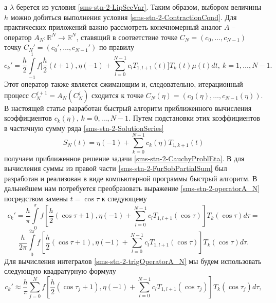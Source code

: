 а $\lambda$ берется из условия \eqref{sms-stn-2-LipSecVar}. Таким образом, выбором величины $h$ можно добиться выполнения условия \eqref{sms-stn-2-ContractionCond}.
Для практических приложений важно рассмотреть конечномерный аналог $A$ -- оператор $A_N : \mathbb{R}^N\rightarrow\mathbb{R}^N$, ставящий в соответствие точке $C_N = (c_0,\ldots,c_{N-1})$ точку $C_N' = (c_0',\ldots,c_{N-1}')$ по правилу
\begin{equation}\label{sms-stn-2-operatorA_N}
c_k'=\frac h2\int\limits_{-1}^1f\bigl[\frac h2(t+1),\eta(-1)+\sum\limits_{l=0}^{N-1}c_l T_{1,l+1}(t)\bigr]T_k(t)\mu(t)dt,\ k=1,\ldots,N-1.
\end{equation}
Этот оператор также является сжимающим \cite{sms-stn-2-PolOrtPorSobChebUrav} и, следовательно, итерационный процесс $C_N^{j+1}=A_N(C_N^j)$ сходится к точке $C_N(\eta)=(c_0(\eta),\dots,c_{N-1}(\eta))$. В настоящей статье разработан быстрый алгоритм приближенного вычисления коэффициентов $c_k(\eta)$, $k=0,\ldots,N-1$. Путем подстановки этих коэффициентов в частичную сумму ряда \eqref{sms-stn-2-SolutionSeries}
\begin{equation}\label{sms-stn-2-FurSobPartialSum}
S_{N}(t)=\eta(-1)+\sum\limits_{k=0}^{N-1}c_k(\eta) T_{1,k+1}(t)
\end{equation}
получаем приближенное решение задачи \eqref{sms-stn-2-CauchyProblEta}. В \cite{sms-stn-2-demiSMS_ShTN} для вычисления суммы из правой части \eqref{sms-stn-2-FurSobPartialSum} был разработан и реализован в виде компьютерной программы быстрый алгоритм. В  дальнейшем нам потребуется преобразовать выражение \eqref{sms-stn-2-operatorA_N} посредством замены $t=\cos\tau$ к следующему
\begin{equation*}
c_k'=  \frac h\pi\int\limits_0^{\pi}f\left[\frac h2(\cos\tau+1),\eta(-1)+\sum\limits_{l=0}^{N-1}c_l T_{1,l+1}(\cos\tau)\right]T_k(\cos\tau)d\tau=
\end{equation*}
\begin{equation}\label{sms-stn-2-trigOperatorA_N}
\frac h{2\pi}\int\limits_0^{2\pi}f\left[\frac h2(\cos\tau+1),\eta(-1)+\sum\limits_{l=0}^{N-1}c_l T_{1,l+1}(\cos\tau)\right]T_k(\cos\tau)d\tau.
\end{equation}
Для вычисления интегралов \eqref{sms-stn-2-trigOperatorA_N} мы будем использовать следующую квадратурную формулу
\begin{equation}\label{sms-stn-2-quadratureA_N}
c_k'\approx  \frac h\pi\sum\limits_{j=0}^{N}f\left[\frac h2(\cos\tau_j+1),\eta(-1)+\sum\limits_{l=0}^{N-1}c_l T_{1,l+1}(\cos\tau_j)\right]T_k(\cos\tau_j)d\tau,
\end{equation}
